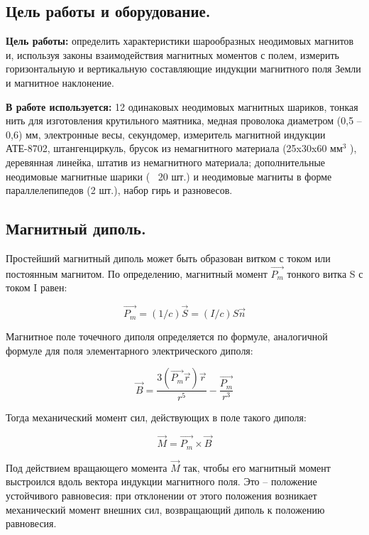 \documentclass[a4paper,12pt]{article} %
\begin{document}
\subsection{Цель работы и оборудование.}

\textbf{Цель работы:} определить характеристики шарообразных неодимовых магнитов и, используя законы взаимодействия магнитных моментов с полем, измерить горизонтальную и вертикальную составляющие индукции магнитного поля Земли и магнитное наклонение.

\textbf{В работе используется:} 12 одинаковых неодимовых магнитных шариков, тонкая нить для изготовления крутильного маятника, медная проволока диаметром (0,5 – 0,6) мм, электронные весы, секундомер, измеритель магнитной индукции АТЕ-8702, штангенциркуль, брусок из немагнитного материала (25x30x60 $\text{мм}^3$ ), деревянная линейка, штатив из немагнитного материала; дополнительные неодимовые магнитные шарики (~ 20 шт.) и неодимовые магниты в форме параллелепипедов (2 шт.), набор гирь и разновесов.

\subsection{Магнитный диполь.}

Простейший магнитный диполь может быть образован витком с током или постоянным магнитом. По определению, магнитный момент $\vec{P_m}$ тонкого витка S с током I равен:

\begin{equation}\label{eq1}
\vec{P_m} = (1/c) \vec{S} = (I/c)S \vec{n}
\end{equation}

Магнитное поле точечного диполя определяется по формуле, аналогичной формуле для поля элементарного электрического диполя:

\begin{equation}\label{eq2}
\vec{B} = \frac{3(\vec{P_m} \vec{r})\vec{r}} {r^5} - \frac{\vec{P_m}}{r^3}
\end{equation}

Тогда механический момент сил, действующих в поле такого диполя:

\begin{equation}\label{eq3}
\vec{M} = \vec{P_m} \times \vec{B}
\end{equation}

Под действием вращающего момента $\vec{M}$ так, чтобы его магнитный момент выстроился вдоль вектора индукции магнитного поля. Это -- положение устойчивого равновесия: при отклонении от этого положения возникает механический момент внешних сил, возвращающий диполь к положению равновесия.
\end{document}
